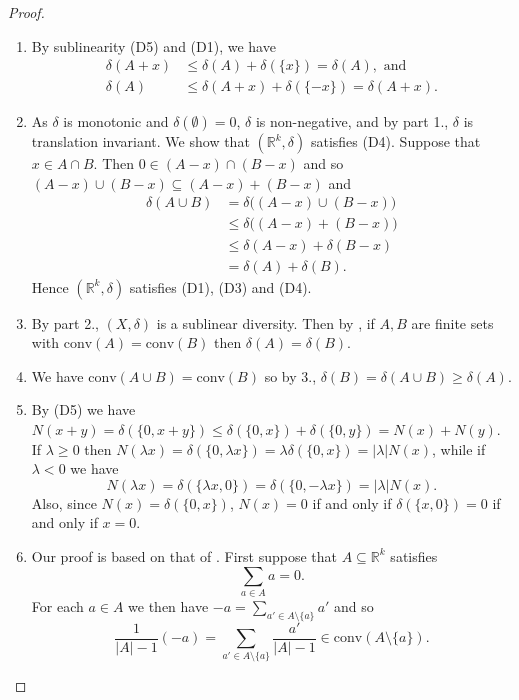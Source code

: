 \documentclass[11pt]{article}
\newcommand{\conv}{\mathrm{conv}}
\renewcommand{\Re}{\mathbb{R}}
\begin{document}
\begin{proof}
\begin{enumerate}
\item 
By sublinearity (D5) and (D1), we have 
\begin{align*}
\delta(A+x) &\leq \delta(A) + \delta(\{x\}) = \delta(A), \mbox{ and } \\ 
\delta(A)& \leq \delta(A+x) + \delta(\{-x\}) = \delta(A+x).
\end{align*}
\item As $\delta$ is monotonic and $\delta(\emptyset) = 0$, $\delta$ is non-negative, and by part 1., $\delta$ is  translation invariant. We show that $(\Re^k,\delta)$ satisfies (D4). Suppose that $x \in A \cap B$. Then $0 \in (A-x) \cap (B-x)$ and so $(A-x) \cup (B-x) \subseteq (A-x)+(B-x)$ and
\begin{align*} \delta(A \cup B) &= \delta\Big( (A -x) \cup (B -x ) \Big) \\&\leq \delta \Big( (A -x) + (B -x ) \Big) \\ 
&\leq \delta(A-x) + \delta(B-x) \\ &= \delta(A) + \delta(B).\end{align*}
Hence $(\Re^k,\delta)$ satisfies (D1), (D3) and (D4). 
\item By part 2., $(X,\delta)$ is a sublinear diversity. Then by \cite[Prop.\ 2.2b]{bryant2023diversities}, if $A, B$ are finite sets with $\conv(A)=\conv(B)$ then $\delta(A)=\delta(B)$.
\item We have $\conv(A \cup B) = \conv(B)$ so by 3., $\delta(B) = \delta(A \cup B) \geq \delta(A)$.
\item By (D5) we have $N(x+y) = \delta(\{0,x+y\}) \leq \delta(\{0,x\}) + \delta(\{0,y\}) = N(x) +N(y)$. If $\lambda\ge 0$ then $N(\lambda x) = \delta(\{0,\lambda x\}) = \lambda \delta(\{0,x\}) = |\lambda| N(x)$, while if $\lambda<0$ we have 
\[N(\lambda x) = \delta(\{\lambda x,0\}) = \delta(\{0,-\lambda x\}) = |\lambda| N(x).\]
Also, since $N(x)=\delta(\{0,x\})$, $N(x)=0$  if and only if $\delta(\{x,0\}) = 0$ if and only if $x=0$.
\item  Our proof is based on that of \cite[Theorem 4.1]{BrandenbergKonig13}. First suppose that $A \subseteq \Re^k$ satisfies 
\begin{equation}
    \sum_{a \in A} a = 0. \label{eq:zerosum}
\end{equation} For each $a \in A$ we then have $-a = \sum_{a' \in A \setminus \{a\}} a'$ and so 
\[ \frac{1}{|A|-1} (-a) = \sum_{a' \in A \setminus \{a\}} \frac{a'}{|A|-1} \in \conv(A \setminus \{a\}).\]

\end{enumerate}
\end{proof}
\end{document}
